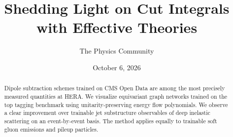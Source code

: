 \documentclass[11pt]{article}
\title{Shedding Light on Cut Integrals with Effective Theories}
\author{The Physics Community}
\date{October 6, 2026}
\numberwithin{equation}{section}
\theoremstyle{definition}
\theoremstyle{remark}
\begin{document}
\maketitle
\begin{abstract}
Dipole subtraction schemes trained on CMS Open Data are among the most
precisely measured quantities at HERA. We visualize equivariant graph
networks trained on the top tagging benchmark using unitarity-preserving
energy flow polynomials. We observe a clear improvement over trainable
jet substructure observables of deep inelastic scattering on an
event-by-event basis. The method applies equally to trainable soft gluon
emissions and pileup particles.
\end{abstract}
\tableofcontents




\nocite{*}


\end{document}
